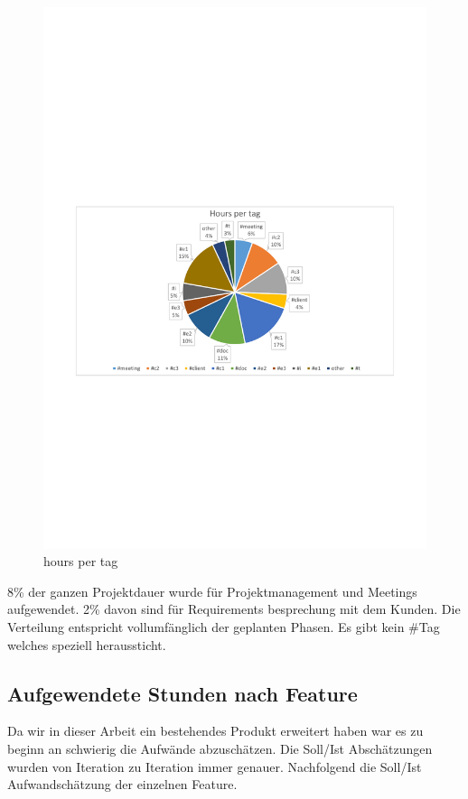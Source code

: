 \begin{figure}[]
	\includegraphics[trim=4cm 9.6cm 3.5cm 11.1cm, clip=true, width=\textwidth]{img/project_monitoring_hours_per_tag_diagram.pdf}
	\caption{hours per tag}
	\label{fig:hours:per:tag}
\end{figure}

8\% der ganzen Projektdauer wurde für Projektmanagement
und Meetings aufgewendet. 2\% davon sind für Requirements besprechung mit dem Kunden. Die Verteilung
entspricht vollumfänglich der geplanten Phasen. Es gibt kein \#Tag welches speziell heraussticht. 


\subsection{Aufgewendete Stunden nach Feature}
Da wir in dieser Arbeit ein bestehendes Produkt erweitert haben war es zu beginn an
schwierig die Aufwände abzuschätzen. Die Soll/Ist Abschätzungen wurden von Iteration zu Iteration
immer genauer. Nachfolgend die Soll/Ist Aufwandschätzung der einzelnen Feature.

